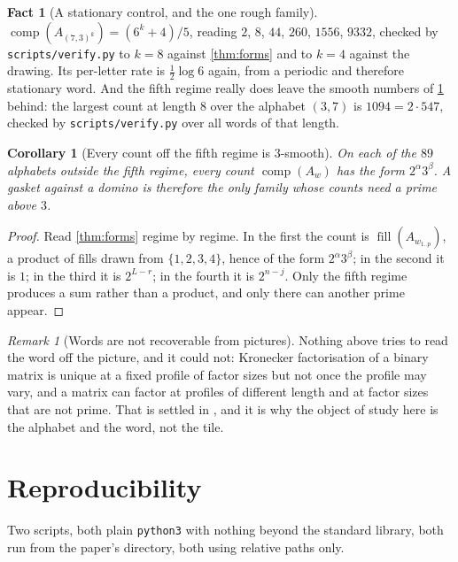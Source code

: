 \documentclass[11pt]{amsart}
\newtheorem{corollary}[theorem]{Corollary}
\theoremstyle{definition}
\newtheorem{fact}[theorem]{Fact}
\theoremstyle{remark}
\newtheorem{remark}[theorem]{Remark}
\newcommand{\vpy}{\texttt{scripts/\allowbreak verify.py}}
\DeclareMathOperator{\comp}{comp}
\DeclareMathOperator{\fil}{fill}
\begin{document}
\begin{fact}[A stationary control, and the one rough family]
\label{fact:byproduct}
$\comp(A_{(7,3)^k}) = (6^k+4)/5$, reading $2$, $8$, $44$, $260$, $1556$, $9332$, checked by \vpy{} to $k = 8$ against \cref{thm:forms} and to $k = 4$ against the drawing. Its per-letter rate is $\tfrac12\log 6$ again, from a periodic and therefore stationary word. And the fifth regime really does leave the smooth numbers of \cref{cor:smooth} behind: the largest count at length $8$ over the alphabet $(3,7)$ is $1094 = 2 \cdot 547$, checked by \vpy{} over all words of that length.
\end{fact}

\begin{corollary}[Every count off the fifth regime is $3$-smooth]
\label{cor:smooth}
On each of the $89$ alphabets outside the fifth regime, every count $\comp(A_w)$ has the form $2^\alpha 3^\beta$. A gasket against a domino is therefore the only family whose counts need a prime above $3$.
\end{corollary}

\begin{proof}
Read \cref{thm:forms} regime by regime. In the first the count is $\fil(A_{w_{1..p}})$, a product of fills drawn from $\{1,2,3,4\}$, hence of the form $2^\alpha 3^\beta$; in the second it is $1$; in the third it is $2^{L-r}$; in the fourth it is $2^{n-j}$. Only the fifth regime produces a sum rather than a product, and only there can another prime appear.
\end{proof}

\begin{remark}[Words are not recoverable from pictures]
\label{rem:monoid}
Nothing above tries to read the word off the picture, and it could not: Kronecker factorisation of a binary matrix is unique at a fixed profile of factor sizes but not once the profile may vary, and a matrix can factor at profiles of different length and at factor sizes that are not prime. That is settled in \cite{voet}, and it is why the object of study here is the alphabet and the word, not the tile.
\end{remark}

\section{Reproducibility}
\label{sec:repro}

Two scripts, both plain \texttt{python3} with nothing beyond the standard library, both run from the paper's directory, both using relative paths only.
\end{document}
